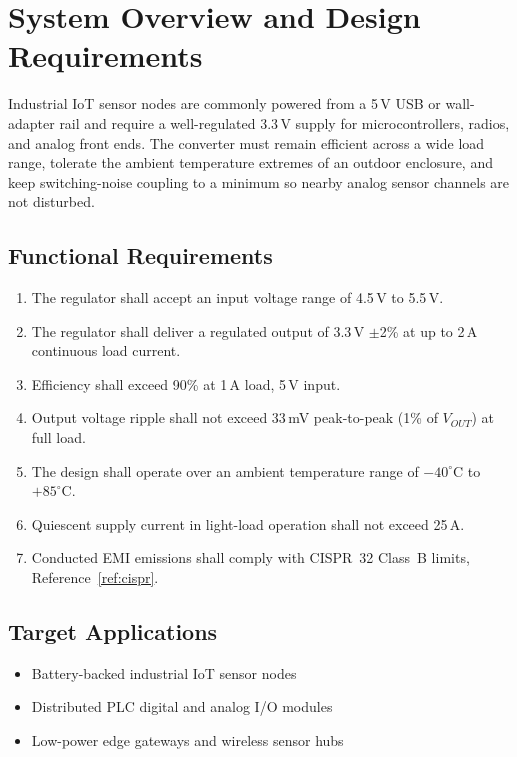 \section{System Overview and Design Requirements}
Industrial IoT sensor nodes are commonly powered from a 5\,V USB or wall-adapter
rail and require a well-regulated 3.3\,V supply for microcontrollers, radios,
and analog front ends. The converter must remain efficient across a wide load
range, tolerate the ambient temperature extremes of an outdoor enclosure, and
keep switching-noise coupling to a minimum so nearby analog sensor channels are
not disturbed.

\subsection{Functional Requirements}
\begin{enumerate}[label=\textbf{REQ-\arabic*:},leftmargin=2.4cm,itemsep=4pt,topsep=4pt]
\item The regulator shall accept an input voltage range of 4.5\,V to 5.5\,V.
\item The regulator shall deliver a regulated output of 3.3\,V $\pm$2\% at up
      to 2\,A continuous load current.
\item Efficiency shall exceed 90\% at 1\,A load, 5\,V input.
\item Output voltage ripple shall not exceed 33\,mV peak-to-peak (1\% of
      $V_{OUT}$) at full load.
\item The design shall operate over an ambient temperature range of
      $-40^\circ$C to $+85^\circ$C.
\item Quiescent supply current in light-load operation shall not exceed
      25\,\textmu A.
\item Conducted EMI emissions shall comply with CISPR~32 Class~B
      limits, Reference~\ref{ref:cispr}.
\end{enumerate}

\subsection{Target Applications}
\begin{itemize}[leftmargin=1.3em,itemsep=2pt]
\item Battery-backed industrial IoT sensor nodes
\item Distributed PLC digital and analog I/O modules
\item Low-power edge gateways and wireless sensor hubs
\end{itemize}

